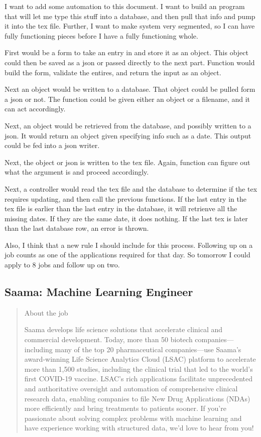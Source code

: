 \documentclass[
	letterpaper, %
	12pt, %
]{CSSullivanBusinessReport}
\begin{document}
I want to add some automation to this document. I want to build an program that will let me type this stuff into a database, and then pull that info and pump it into the tex file. Further, I want to make system very segmented, so I can have fully functioning pieces before I have a fully functioning whole. 

First would be a form to take an entry in and store it as an object. This object could then be saved as a json or passed directly to the next part. Function would build the form, validate the entires, and return the input as an object. 

Next an object would be written to a database. That object could be pulled form a json or not. The function could be given either an object or a filename, and it can act accordingly. 

Next, an object would be retrieved from the database, and possibly written to a json. It would return an object given specifying info such as a date. This output could be fed into a json writer. 

Next, the object or json is written to the tex file. Again, function can figure out what the argument is and proceed accordingly. 

Next, a controller would read the tex file and the database to determine if the tex requires updating, and then call the previous functions. If the last entry in the tex file is earlier than the last entry in the database, it will retrienve all the missing dates. If they are the same date, it does nothing. If the last tex is later than the last database row, an error is thrown. 

Also, I think that a new rule I should include for this process. Following up on a job counts as one of the applications required for that day. So tomorrow I could apply to 8 jobs and follow up on two. 


\subsection[Saama]{Saama: Machine Learning Engineer}

\begin{quote}
	About the job
	
	Saama develops life science solutions that accelerate clinical and commercial development. Today, more than 50 biotech companies—including many of the top 20 pharmaceutical companies—use Saama's award-winning Life Science Analytics Cloud (LSAC) platform to accelerate more than 1,500 studies, including the clinical trial that led to the world's first COVID-19 vaccine. LSAC's rich applications facilitate unprecedented and authoritative oversight and automation of comprehensive clinical research data, enabling companies to file New Drug Applications (NDAs) more efficiently and bring treatments to patients sooner. If you're passionate about solving complex problems with machine learning and have experience working with structured data, we'd love to hear from you!

\end{quote}
\end{document}
